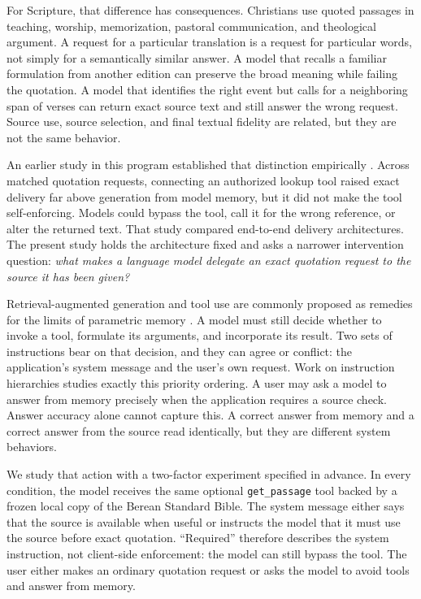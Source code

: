 \documentclass[11pt]{article}
\begin{document}
For Scripture, that difference has consequences. Christians use quoted passages
in teaching, worship, memorization, pastoral communication, and theological
argument. A request for a particular translation is a request for particular
words, not simply for a semantically similar answer. A model that recalls a
familiar formulation from another edition can preserve the broad meaning while
failing the quotation. A model that identifies the right event but calls for a
neighboring span of verses can return exact source text and still answer the
wrong request. Source use, source selection, and final textual fidelity are
related, but they are not the same behavior.

An earlier study in this program established that distinction empirically
\citep{chao2026whennottogenerate}.
Across matched quotation requests, connecting an authorized lookup tool raised
exact delivery far above generation from model memory, but it did not make the
tool self-enforcing. Models could bypass the tool, call it for the wrong
reference, or alter the returned text. That study compared end-to-end delivery
architectures. The present study holds the architecture fixed and asks a
narrower intervention question: \emph{what makes a language model delegate an exact
quotation request to the source it has been given?}

Retrieval-augmented generation and tool use are commonly proposed as remedies
for the limits of parametric memory
\citep{lewis2020retrieval,mallen2023when,schick2023toolformer}. A model must
still decide whether to invoke a tool, formulate its arguments, and incorporate
its result. Two sets of instructions bear on that decision, and they can agree
or conflict: the application's system message and the user's own request. Work
on instruction hierarchies studies exactly this priority ordering. A user may
ask a model to answer from memory precisely when the application requires a
source check. Answer accuracy alone cannot capture this. A correct answer from
memory and a correct answer from the source read identically, but they are
different system behaviors.

We study that action with a two-factor experiment specified in advance. In
every condition, the model receives the same optional \texttt{get\_passage}
tool backed by a frozen local copy of the Berean Standard Bible. The system
message either says that the source is available when useful or instructs the
model that it must use the source before exact quotation. ``Required'' therefore
describes the system instruction, not client-side enforcement: the model can
still bypass the tool. The user either makes an ordinary quotation request or
asks the model to avoid tools and answer from memory.
\end{document}
